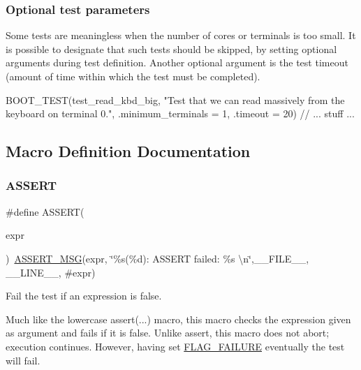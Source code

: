 \subsubsection*{Optional test parameters }

Some tests are meaningless when the number of cores or terminals is too small. It is possible to designate that such tests should be skipped, by setting optional arguments during test definition. Another optional argument is the test timeout (amount of time within which the test must be completed). \begin{DoxyVerb}BOOT_TEST(test_read_kbd_big,
        "Test that we can read massively from the keyboard on terminal 0.",
        .minimum_terminals = 1, .timeout = 20)
{
    // ... stuff ...
}
\end{DoxyVerb}
 

\subsection{Macro Definition Documentation}
\mbox{\label{group__Testing_ga28301f76c53b643912da7c538f74e2c6}} 
\subsubsection{\texorpdfstring{A\+S\+S\+E\+RT}{ASSERT}}
{\footnotesize\ttfamily \#define A\+S\+S\+E\+RT(\begin{DoxyParamCaption}\item[{}]{expr }\end{DoxyParamCaption})~\hyperlink{group__Testing_ga9be407f8744aff436633d34c62591cb9}{A\+S\+S\+E\+R\+T\+\_\+\+M\+SG}(expr, \char`\"{}\%s(\%d)\+: A\+S\+S\+E\+RT failed\+: \%s \textbackslash{}n\char`\"{},\+\_\+\+\_\+\+F\+I\+L\+E\+\_\+\+\_\+, \+\_\+\+\_\+\+L\+I\+N\+E\+\_\+\+\_\+, \#expr)}



Fail the test if an expression is false. 

Much like the lowercase {\ttfamily assert}(...) macro, this macro checks the expression given as argument and fails if it is false. Unlike {\ttfamily assert}, this macro does not abort; execution continues. However, having set \hyperlink{group__Testing_ga35895e417ef253455c9cf365cb66d87c}{F\+L\+A\+G\+\_\+\+F\+A\+I\+L\+U\+RE} eventually the test will fail.

